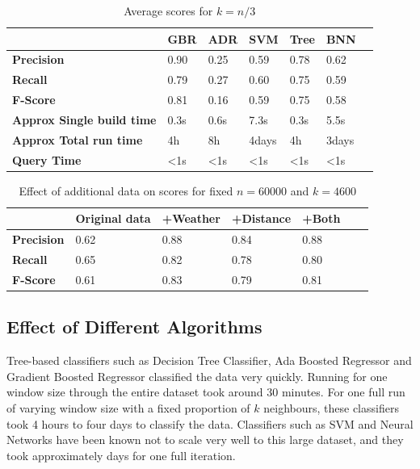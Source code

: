 \documentclass[letterpaper,11pt]{article}
\begin{document}
\begin{centering}
\begin{table}
\begin{tabular}{ | l | l | l | l | l | l | l |}
  \hline
   & \textbf{GBR}& \textbf{ADR} & \textbf{SVM} & \textbf{Tree} & \textbf{BNN}\\ \hline
  \textbf{Precision} & 0.90 & 0.25 & 0.59 & 0.78 & 0.62 \\  \hline
  \textbf{Recall} & 0.79 & 0.27 & 0.60 & 0.75 & 0.59 \\  \hline
  \textbf{F-Score} & 0.81 & 0.16 & 0.59 & 0.75 & 0.58 \\  \hline
    \textbf{Approx Single build time} & 0.3s & 0.6s & 7.3s & 0.3s & 5.5s\\ \hline
    \textbf{Approx Total run time} & 4h & 8h & 4days & 4h & 3days\\ \hline
    \textbf{Query Time} & \textless1s & \textless1s & \textless1s & \textless1s & \textless1s\\ 
  \hline
\end{tabular}
\label{table:b}
\caption{Average scores for $k=n/3$}  
\end{table}
\end{centering}

\begin{centering}
\begin{table}
\begin{tabular}{ | l | l | l | l | l | l | l |}
  \hline
   & \textbf{Original data}& \textbf{+Weather} & \textbf{+Distance} & \textbf{+Both}\\ \hline
  \textbf{Precision}  & 0.62 & 0.88 & 0.84 & 0.88 \\  \hline
  \textbf{Recall} & 0.65 & 0.82 & 0.78 & 0.80 \\  \hline
  \textbf{F-Score} & 0.61 & 0.83 & 0.79 & 0.81 \\  \hline
\end{tabular}
\label{table:c}
\caption{Effect of additional data on scores for fixed $n=60 000$ and $k=4600$}  
\end{table}
\end{centering}


\subsection{Effect of Different Algorithms}
Tree-based classifiers such as Decision Tree Classifier, Ada Boosted Regressor and Gradient Boosted Regressor classified the data very quickly. Running for one window size through the entire dataset took around 30 minutes. For one full run of varying window size with a fixed proportion of $k$ neighbours, these classifiers took 4 hours to four days to classify the data. Classifiers such as SVM and Neural Networks have been known not to scale very well to this large dataset, and they took approximately days for one full iteration. 
\end{document}
